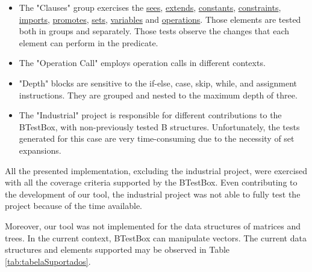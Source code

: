 \documentclass[runningheads]{llncs}
\begin{document}
\begin{itemize}
    \item The "Clauses" group exercises the \underline{sees}, \underline{extends}, \underline{constants}, \underline{constraints}, \underline{imports}, \underline{promotes}, \underline{sets}, \underline{variables} and \underline{operations}. Those elements are tested both in groups and separately. Those tests observe the changes that each element can perform in the predicate.
    \item The "Operation Call" employs operation calls in different contexts.
    \item "Depth" blocks are sensitive to the if-else, case, skip, while, and assignment instructions. They are grouped and nested to the maximum depth of three.
    \item The "Industrial" project is responsible for different contributions to the BTestBox, with non-previously tested B structures. Unfortunately, the tests generated for this case are very time-consuming due to the necessity of set expansions.
\end{itemize}

All the presented implementation, excluding the industrial project, were exercised with all the coverage criteria supported by the BTestBox. Even contributing to the development of our tool, the industrial project was not able to fully test the project because of the time available.

Moreover, our tool was not implemented for the data structures of matrices and trees. In the current context, BTestBox can manipulate vectors. The current data structures and elements supported may be observed in Table \ref{tab:tabelaSuportados}.
\end{document}

